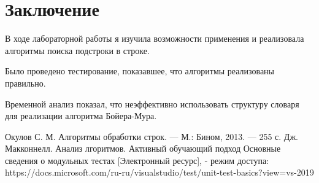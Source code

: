 \documentclass[12pt]{report}
\begin{document}
\chapter*{Заключение}
В ходе лабораторной работы я изучила возможности применения и реализовала алгоритмы поиска подстроки в строке. 

Было проведено тестирование, показавшее, что алгоритмы реализованы правильно.

Временной анализ показал, что неэффективно использовать структуру словаря для реализации алгоритма Бойера-Мура.


 \begin{thebibliography}{3}
 Окулов С. М. Алгоритмы обработки строк. — М.: Бином, 2013. — 255 с.
 Дж. Макконнелл. Анализ лгоритмов. Активный обучающий подход
Основные сведения о модульных тестах [Электронный ресурс], - режим доступа: https://docs.microsoft.com/ru-ru/visualstudio/test/unit-test-basics?view=vs-2019
\end{thebibliography}
\end{document}
